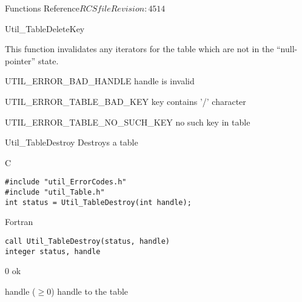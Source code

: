 \begin{cactuspart}{ Functions Reference}{$RCSfile$}{$Revision: 4514 $}
\begin{FunctionDescription}{Util\_TableDeleteKey}
\begin{Discussion}
This function invalidates any iterators for the table which are
not in the ``null-pointer'' state.
\end{Discussion}

\begin{ErrorSection}
\begin{Error}{UTIL\_ERROR\_BAD\_HANDLE}
handle is invalid
\end{Error}
\begin{Error}{UTIL\_ERROR\_TABLE\_BAD\_KEY}
key contains '/' character
\end{Error}
\begin{Error}{UTIL\_ERROR\_TABLE\_NO\_SUCH\_KEY}
no such key in table
\end{Error}
\end{ErrorSection}
\end{FunctionDescription}


\begin{FunctionDescription}{Util\_TableDestroy}
\label{Util-TableDestroy}
Destroys a table

\begin{SynopsisSection}
\begin{Synopsis}{C}
\begin{verbatim}
#include "util_ErrorCodes.h"
#include "util_Table.h"
int status = Util_TableDestroy(int handle);
\end{verbatim}
\end{Synopsis}
\begin{Synopsis}{Fortran}
\begin{verbatim}
call Util_TableDestroy(status, handle)
integer status, handle
\end{verbatim}
\end{Synopsis}
\end{SynopsisSection}

\begin{ResultSection}
\begin{Result}{\rm 0}
ok
\end{Result}
\end{ResultSection}

\begin{ParameterSection}
\begin{Parameter}{handle ($\ge 0$)}
handle to the table
\end{Parameter}
\end{ParameterSection}


\end{FunctionDescription}
\end{cactuspart}
